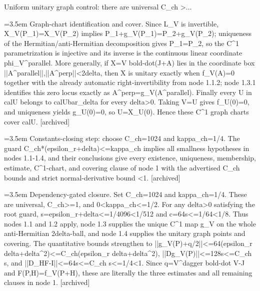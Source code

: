 \documentclass{article}
\newcommand{\step}[1]{\par\noindent\hangindent=3.5em\hangafter=1%
  \makebox[3.5em][l]{\textbf{#1.}}}
\newcommand{\steptag}[1]{\hfill{\small\textsf{[#1]}}}
\begin{document}
\begin{proofbox}{Uniform unitary graph control: there are universal C\_ch >...}
\step{1.4.2} Graph-chart identification and cover. Since L\_V is invertible, X\_V(P\_1)=X\_V(P\_2) implies P\_1+g\_V(P\_1)=P\_2+g\_V(P\_2); uniqueness of the Hermitian/anti-Hermitian decomposition gives P\_1=P\_2, so the C\textasciicircum{}1 parametrization is injective and its inverse is the continuous linear coordinate phi\_V\textasciicircum{}parallel. More generally, if X=V bold-dot(J+A) lies in the coordinate box ||A\textasciicircum{}parallel||,||A\textasciicircum{}perp||<2delta, then X is unitary exactly when f\_V(A)=0 together with the already automatic right-invertibility from node 1.1.2; node 1.3.1 identifies this zero locus exactly as A\textasciicircum{}perp=g\_V(A\textasciicircum{}parallel). Finally every U in calU belongs to calUbar\_delta for every delta>0. Taking V=U gives f\_U(0)=0, and uniqueness yields g\_U(0)=0, so U=X\_U(0). Hence these C\textasciicircum{}1 graph charts cover calU. \steptag{archived} \\[4pt]
\step{1.5} Constants-closing step: choose C\_ch=1024 and kappa\_ch=1/4. The guard C\_ch*(epsilon\_r+delta)<=kappa\_ch implies all smallness hypotheses in nodes 1.1-1.4, and their conclusions give every existence, uniqueness, membership, estimate, C\textasciicircum{}1-chart, and covering clause of node 1 with the advertised C\_ch bounds and strict normal-derivative bound <1. \steptag{archived} \\[6pt]
\step{1.5.1} Dependency-gated closure. Set C\_ch=1024 and kappa\_ch=1/4. These are universal, C\_ch>=1, and 0<kappa\_ch<=1/2. For any delta>0 satisfying the root guard, s=epsilon\_r+delta<=1/4096<1/512 and c=64s<=1/64<1/8. Thus nodes 1.1 and 1.2 apply, node 1.3 supplies the unique C\textasciicircum{}1 map g\_V on the whole anti-Hermitian 2delta-ball, and node 1.4 supplies the unitary graph points and covering. The quantitative bounds strengthen to ||g\_V(P)+q/2||<=64(epsilon\_r delta+delta\textasciicircum{}2)<=C\_ch(epsilon\_r delta+delta\textasciicircum{}2), ||Dg\_V(P)||<=128s<=C\_ch s, and ||D\_HF-I||<=64s<=C\_ch s<=1/4<1. Since q=V\textasciicircum{}dagger bold-dot V-J and F(P,H)=f\_V(P+H), these are literally the three estimates and all remaining clauses in node 1. \steptag{archived} \\[4pt]
\end{proofbox}
\end{document}
